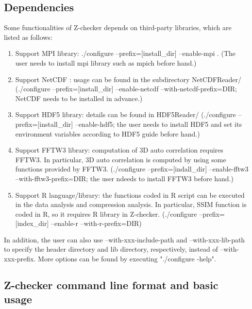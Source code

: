 \subsection{Dependencies}

Some functionalities of Z-checker depends on third-party libraries, which are listed as follows:

\begin{enumerate}
\item Support MPI library: ./configure --prefix=[install\_dir] --enable-mpi . (The user needs to install mpi library such as mpich before hand.)
\item Support NetCDF : usage can be found in the subdirectory NetCDFReader/ (./configure --prefix=[install\_dir] --enable-netcdf --with-netcdf-prefix=DIR; NetCDF needs to be installed in advance.)
\item Support HDF5 library: details can be found in HDF5Reader/ (./configure --prefix=[install\_dir] --enable-hdf5; the user needs to install HDF5 and set its environment variables according to HDF5 guide before hand.)
\item Support FFTW3 library: computation of 3D auto correlation requires FFTW3. In particular, 3D auto correlation is computed by using some functions provided by FFTW3. (./configure --prefix=[indall\_dir] --enable-fftw3 --with-fftw3-prefix=DIR; the user ndeeds to install FFTW3 before hand.)
\item Support R language/library: the functions coded in R script can be executed in the data analysis and compression analysis. In particular, SSIM function is coded in R, so it requires R library in Z-checker. (./configure --prefix=[index\_dir] --enable-r --with-r-prefix=DIR)
\end{enumerate}

In addition, the user can also use --with-xxx-include-path and --with-xxx-lib-path to specify the header directory and lib directory, respectively, instead of --with-xxx-prefix. More options can be found by executing "./configure -help".

\subsection{Z-checker command line format and basic usage}

